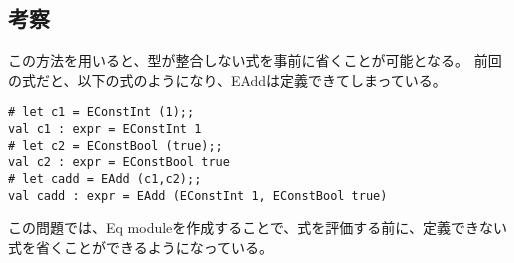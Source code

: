 \documentclass[uplatex,12pt]{jsarticle}
\begin{document}
\subsection{考察}

この方法を用いると、型が整合しない式を事前に省くことが可能となる。
前回の式だと、以下の式のようになり、EAddは定義できてしまっている。
\begin{lstlisting}[caption=前回の問5]
# let c1 = EConstInt (1);;
val c1 : expr = EConstInt 1
# let c2 = EConstBool (true);;
val c2 : expr = EConstBool true
# let cadd = EAdd (c1,c2);;
val cadd : expr = EAdd (EConstInt 1, EConstBool true)
\end{lstlisting}
この問題では、Eq moduleを作成することで、式を評価する前に、定義できない式を省くことができるようになっている。
\end{document}
